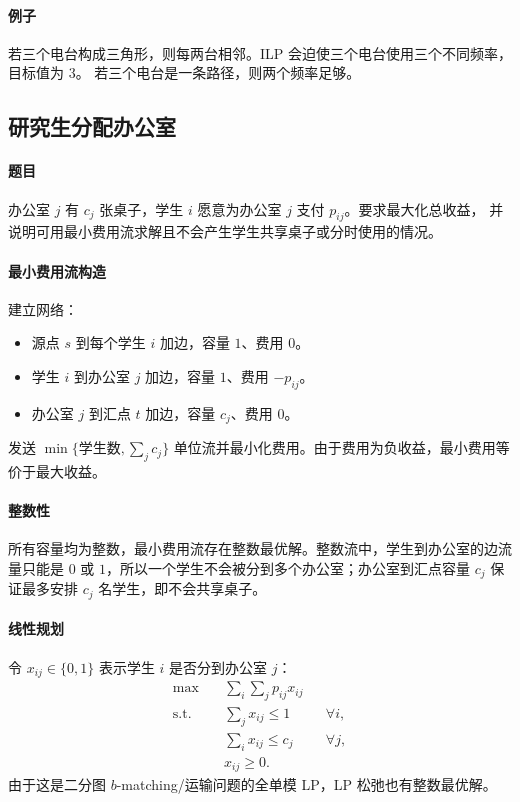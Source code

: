 \documentclass[UTF8,openany,12pt]{ctexbook}
\theoremstyle{remark}
\begin{document}
\paragraph{例子}
若三个电台构成三角形，则每两台相邻。ILP 会迫使三个电台使用三个不同频率，目标值为 $3$。
若三个电台是一条路径，则两个频率足够。

\subsection{研究生分配办公室}

\paragraph{题目}
办公室 $j$ 有 $c_j$ 张桌子，学生 $i$ 愿意为办公室 $j$ 支付 $p_{ij}$。要求最大化总收益，
并说明可用最小费用流求解且不会产生学生共享桌子或分时使用的情况。

\paragraph{最小费用流构造}
建立网络：
\begin{itemize}
  \item 源点 $s$ 到每个学生 $i$ 加边，容量 $1$、费用 $0$。
  \item 学生 $i$ 到办公室 $j$ 加边，容量 $1$、费用 $-p_{ij}$。
  \item 办公室 $j$ 到汇点 $t$ 加边，容量 $c_j$、费用 $0$。
\end{itemize}
发送 $\min\{\text{学生数},\sum_j c_j\}$ 单位流并最小化费用。由于费用为负收益，最小费用等价于最大收益。

\paragraph{整数性}
所有容量均为整数，最小费用流存在整数最优解。整数流中，学生到办公室的边流量只能是
$0$ 或 $1$，所以一个学生不会被分到多个办公室；办公室到汇点容量 $c_j$ 保证最多安排
$c_j$ 名学生，即不会共享桌子。

\paragraph{线性规划}
令 $x_{ij}\in\{0,1\}$ 表示学生 $i$ 是否分到办公室 $j$：
\[
\begin{aligned}
  \max\quad &\sum_i\sum_j p_{ij}x_{ij}\\
  \text{s.t.}\quad
  &\sum_j x_{ij}\le 1 &&\forall i,\\
  &\sum_i x_{ij}\le c_j &&\forall j,\\
  &x_{ij}\ge0.
\end{aligned}
\]
由于这是二分图 $b$-matching/运输问题的全单模 LP，LP 松弛也有整数最优解。
\end{document}
